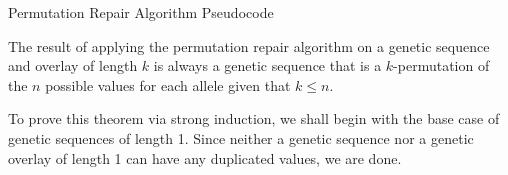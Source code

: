 %
%
\begin{algorithm}
	\SetAlgoLined
	       
	\BlankLine

	
	\BlankLine

	\caption{Permutation Repair Algorithm Pseudocode}
	\label{PRA-Alg}
\end{algorithm}


\begin{thm}
The result of applying the permutation repair algorithm on a genetic sequence and overlay of length $k$ is always a genetic sequence that is a $k$-permutation of the $n$ possible values for each allele given that $ k \leq n$.
\end{thm}

To prove this theorem via strong induction, we shall begin with the base case of genetic sequences of length 1. Since neither a genetic sequence nor a genetic overlay of length 1 can have any duplicated values, we are done. 

